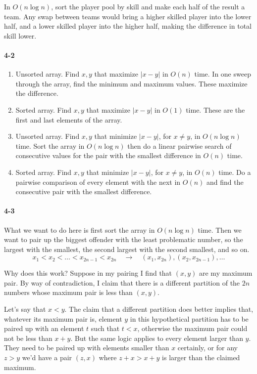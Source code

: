\documentclass{report}
\begin{document}
In $O(n\log n)$, sort the player pool by skill and make each half of the result a team. Any swap between teams would bring a higher skilled player into the lower half, and a lower skilled player into the higher half, making the difference in total skill lower.

\paragraph{4-2}
\begin{enumerate}[label=(\alph*)]
	\item Unsorted array. Find $x, y$ that maximize $|x-y|$ in $O(n)$ time. In one sweep through the array, find the minimum and maximum values. These maximize the difference.
	\item Sorted array. Find $x, y$ that maximize $|x-y|$ in $O(1)$ time. These are the first and last elements of the array.
	\item Unsorted array. Find $x, y$ that minimize $|x-y|$, for $x\ne y$, in $O(n\log n)$ time. Sort the array in $O(n\log n)$ then do a linear pairwise search of consecutive values for the pair with the smallest difference in $O(n)$ time.
	\item Sorted array. Find $x, y$ that minimize $|x-y|$, for $x\ne y$, in $O(n)$ time. Do a pairwise comparison of every element with the next in $O(n)$ and find the consecutive pair with the smallest difference.
\end{enumerate}

\paragraph{4-3} What we want to do here is first sort the array in $O(n\log n)$ time. Then we want to pair up the biggest offender with the least problematic number, so the largest with the smallest, the second largest with the second smallest, and so on.
\begin{equation*}
	x_1 < x_2 < \ldots < x_{2n-1} < x_{2n} \quad\rightarrow\quad (x_1, x_{2n}), (x_2, x_{2n-1}), \ldots
\end{equation*}

Why does this work? Suppose in my pairing I find that $(x,y)$ are my maximum pair. By way of contradiction, I claim that there is a different partition of the $2n$ numbers whose maximum pair is less than $(x,y)$.

Let's say that $x<y$. The claim that a different partition does better implies that, whatever its maximum pair is, element $y$ in this hypothetical partition has to be paired up with an element $t$ such that $t<x$, otherwise the maximum pair could not be less than $x+y$. But the same logic applies to every element larger than $y$. They need to be paired up with elements smaller than $x$ certainly, or for any $z>y$ we'd have a pair $(z,x)$ where $z+x > x+y$ is larger than the claimed maximum.
\end{document}
